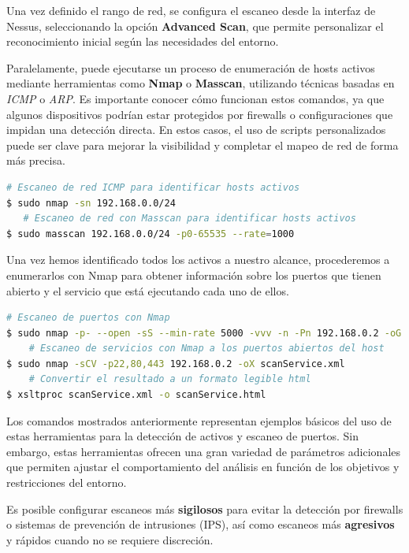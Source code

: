 \documentclass[a4paper, 11pt]{article}
\begin{document}
Una vez definido el rango de red, se configura el escaneo desde la interfaz de Nessus, seleccionando la opción \textbf{Advanced Scan}, que permite personalizar el reconocimiento inicial según las necesidades del entorno.


Paralelamente, puede ejecutarse un proceso de enumeración de hosts activos mediante herramientas como \textbf{Nmap} o \textbf{Masscan}, utilizando técnicas basadas en \textit{ICMP} o \textit{ARP}. Es importante conocer cómo funcionan estos comandos, ya que algunos dispositivos podrían estar protegidos por firewalls o configuraciones que impidan una detección directa. En estos casos, el uso de scripts personalizados puede ser clave para mejorar la visibilidad y completar el mapeo de red de forma más precisa.


\begin{lstlisting}[language=bash, style=terminalstyle, caption=Escaneo de activos en la red]
    # Escaneo de red ICMP para identificar hosts activos
$ sudo nmap -sn 192.168.0.0/24
   # Escaneo de red con Masscan para identificar hosts activos 
$ sudo masscan 192.168.0.0/24 -p0-65535 --rate=1000
\end{lstlisting}


Una vez hemos identificado todos los activos a nuestro alcance, procederemos a enumerarlos con Nmap para obtener información sobre los puertos que tienen abierto y el servicio que está ejecutando cada uno de ellos.

\begin{lstlisting}[language=bash, style=terminalstyle, caption=Escaneo de puertos y servicios con Nmap]
    # Escaneo de puertos con Nmap
$ sudo nmap -p- --open -sS --min-rate 5000 -vvv -n -Pn 192.168.0.2 -oG allPorts
    # Escaneo de servicios con Nmap a los puertos abiertos del host
$ sudo nmap -sCV -p22,80,443 192.168.0.2 -oX scanService.xml
    # Convertir el resultado a un formato legible html
$ xsltproc scanService.xml -o scanService.html
\end{lstlisting}


Los comandos mostrados anteriormente representan ejemplos básicos del uso de estas herramientas para la detección de activos y escaneo de puertos. Sin embargo, estas herramientas ofrecen una gran variedad de parámetros adicionales que permiten ajustar el comportamiento del análisis en función de los objetivos y restricciones del entorno.

Es posible configurar escaneos más \textbf{sigilosos} para evitar la detección por firewalls o sistemas de prevención de intrusiones (IPS), así como escaneos más \textbf{agresivos} y rápidos cuando no se requiere discreción.
\end{document}
